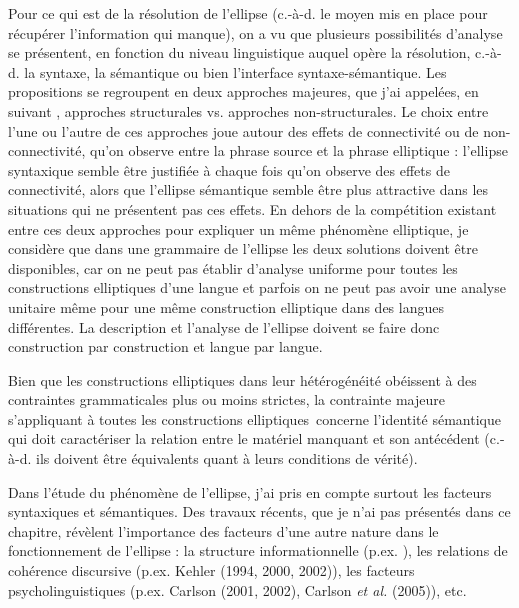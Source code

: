 Pour ce qui est de la résolution de l'ellipse (c.-à-d. le moyen mis en place pour récupérer l'information qui manque), on a vu que plusieurs possibilités d'analyse se présentent, en fonction du niveau linguistique auquel opère la résolution, c.-à-d. la syntaxe, la sémantique ou bien l'interface syntaxe-sémantique. Les propositions se regroupent en deux approches majeures, que j'ai appelées, en suivant \citet{Merchant2009}, approches structurales vs. approches non-structurales. Le choix entre l'une ou l'autre de ces approches joue autour des effets de connectivité ou de non-connectivité, qu'on observe entre la phrase source et la phrase elliptique : l'ellipse syntaxique semble être justifiée à chaque fois qu'on observe des effets de connectivité, alors que l'ellipse sémantique semble être plus attractive dans les situations qui ne présentent pas ces effets. En dehors de la compétition existant entre ces deux approches pour expliquer un même phénomène elliptique, je considère que dans une grammaire de l'ellipse les deux solutions doivent être disponibles, car on ne peut pas établir d'analyse uniforme pour toutes les constructions elliptiques d'une langue et parfois on ne peut pas avoir une analyse unitaire même pour une même construction elliptique dans des langues différentes. La description et l'analyse de l'ellipse doivent se faire donc construction par construction et langue par langue.

Bien que les constructions elliptiques dans leur hétérogénéité obéissent à des contraintes grammaticales plus ou moins strictes, la contrainte majeure s'appliquant à toutes les constructions elliptiques~concerne l'identité sémantique qui doit caractériser la relation entre le matériel manquant et son antécédent (c.-à-d. ils doivent être équivalents quant à leurs conditions de vérité). 

Dans l'étude du phénomène de l'ellipse, j'ai pris en compte surtout les facteurs syntaxiques et sémantiques. Des travaux récents, que je n'ai pas présentés dans ce chapitre, révèlent l'importance des facteurs d'une autre nature dans le fonctionnement de l'ellipse : la structure informationnelle (p.ex. \citet{Winkler2005}), les relations de cohérence discursive (p.ex. Kehler (1994, 2000, 2002)), les facteurs psycholinguistiques (p.ex. Carlson (2001, 2002), Carlson \textit{et al.} (2005)), etc. 

